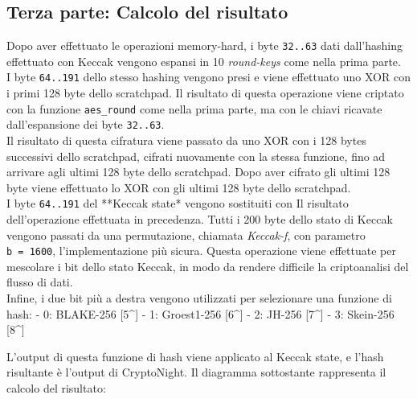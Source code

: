 \documentclass[
]{article}
\begin{document}
\subsection{Terza parte: Calcolo del
risultato}\label{terza-parte-calcolo-del-risultato}

Dopo aver effettuato le operazioni memory-hard, i byte \texttt{32..63}
dati dall'hashing effettuato con Keccak vengono espansi in 10
\emph{round-keys} come nella prima parte.\\
I byte \texttt{64..191} dello stesso hashing vengono presi e viene
effettuato uno XOR con i primi 128 byte dello scratchpad. Il risultato
di questa operazione viene criptato con la funzione \texttt{aes\_round}
come nella prima parte, ma con le chiavi ricavate dall'espansione dei
byte \texttt{32..63}.\\
Il risultato di questa cifratura viene passato da uno XOR con i 128
bytes successivi dello scratchpad, cifrati nuovamente con la stessa
funzione, fino ad arrivare agli ultimi 128 byte dello scratchpad. Dopo
aver cifrato gli ultimi 128 byte viene effettuato lo XOR con gli ultimi
128 byte dello scratchpad.\\
I byte \texttt{64..191} del **Keccak state* vengono sostituiti con Il
risultato dell'operazione effettuata in precedenza. Tutti i 200 byte
dello stato di Keccak vengono passati da una permutazione, chiamata
\emph{Keccak-f}, con parametro \texttt{b\ =\ 1600}, l'implementazione
più sicura. Questa operazione viene effettuate per mescolare i bit dello
stato Keccak, in modo da rendere difficile la criptoanalisi del flusso
di dati.\\
Infine, i due bit più a destra vengono utilizzati per selezionare una
funzione di hash: - 0: BLAKE-256 {[}5\^{}{]} - 1: Groest1-256
{[}6\^{}{]} - 2: JH-256 {[}7\^{}{]} - 3: Skein-256 {[}8\^{}{]}

L'output di questa funzione di hash viene applicato al Keccak state, e
l'hash risultante è l'output di CryptoNight. Il diagramma sottostante
rappresenta il calcolo del risultato:
\end{document}
